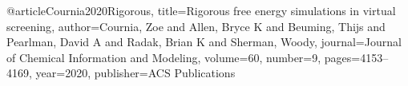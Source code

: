 @article{Cournia2020Rigorous,
  title={Rigorous free energy simulations in virtual screening},
  author={Cournia, Zoe and Allen, Bryce K and Beuming, Thijs and Pearlman, David A and Radak, Brian K and Sherman, Woody},
  journal={Journal of Chemical Information and Modeling},
  volume={60},
  number={9},
  pages={4153--4169},
  year={2020},
  publisher={ACS Publications}
}
